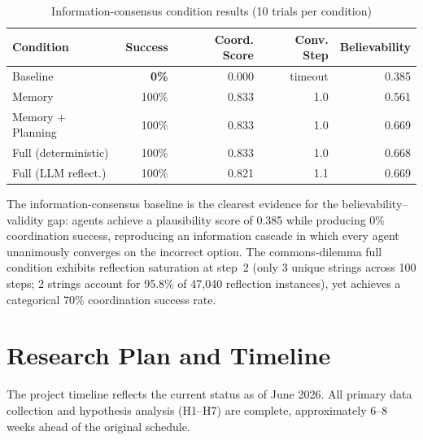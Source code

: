 \documentclass[11pt]{article}
\begin{document}
\begin{table}[h]
\centering
\caption{Information-consensus condition results (10 trials per condition)}
\label{tab:ic_results}
\begin{tabular}{lrrrr}
\toprule
Condition & Success & Coord. Score & Conv. Step & Believability \\
\midrule
Baseline & \textbf{0\%} & 0.000 & timeout & 0.385 \\
Memory & 100\% & 0.833 & 1.0 & 0.561 \\
Memory + Planning & 100\% & 0.833 & 1.0 & 0.669 \\
Full (deterministic) & 100\% & 0.833 & 1.0 & 0.668 \\
Full (LLM reflect.) & 100\% & 0.821 & 1.1 & 0.669 \\
\bottomrule
\end{tabular}
\end{table}

The information-consensus baseline is the clearest evidence for the believability--validity gap: agents achieve a plausibility score of 0.385 while producing 0\% coordination success, reproducing an information cascade in which every agent unanimously converges on the incorrect option. The commons-dilemma full condition exhibits reflection saturation at step~2 (only 3 unique strings across 100 steps; 2 strings account for 95.8\% of 47,040 reflection instances), yet achieves a categorical 70\% coordination success rate.

\section{Research Plan and Timeline}

The project timeline reflects the current status as of June 2026. All primary data collection and hypothesis analysis (H1--H7) are complete, approximately 6--8 weeks ahead of the original schedule.
\end{document}
